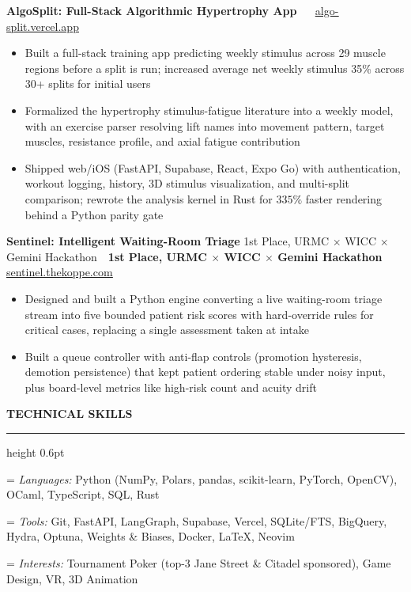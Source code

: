 \documentclass[10pt,letterpaper]{article}
\providecommand{\uline}[1]{\underline{#1}}
\newlength{\sectiongap}   \setlength{\sectiongap}{5.0pt}  %
\newlength{\sectiondrop}  \setlength{\sectiondrop}{2.5pt} %
\newlength{\entrygap}     \setlength{\entrygap}{3.0pt}    %
\newlength{\labelwd}      %
\newcommand{\link}[2]{\href{#1}{\uline{\textcolor{linkblue}{#2}}}}
\newcommand{\resumesection}[1]{%
  \vspace{\sectiongap}%
  {\bfseries\MakeUppercase{#1}}\par
  \vspace{1.5pt}%
  {\color{rulegray}\hrule height 0.6pt}%
  \vspace{\sectiondrop}%
}
\newcommand{\project}[4][]{%
  \vspace{\entrygap}%
  \textbf{#2}%
  \ifx\relax#1\relax\else\ \textcolor{rulegray}{\textbar}\ \textbf{#1}\fi
  \hfill \link{#3}{#4}\par
  \vspace{1.0pt}%
}
\newcommand{\detail}[2]{%
  \settowidth{\labelwd}{\textit{#1:} }%
  \hangindent=\labelwd\hangafter=1
  \textit{#1:} #2\par
}
\begin{document}
\project{AlgoSplit: Full-Stack Algorithmic Hypertrophy App}%
        {https://algo-split.vercel.app/}{algo-split.vercel.app}
\begin{itemize}
  \item Built a full-stack training app predicting weekly stimulus across 29 muscle regions before a split is run; increased average net weekly stimulus 35\% across 30+ splits for initial users
  \item Formalized the hypertrophy stimulus-fatigue literature into a weekly model, with an exercise parser resolving lift names into movement pattern, target muscles, resistance profile, and axial fatigue contribution
  \item Shipped web/iOS (FastAPI, Supabase, React, Expo Go) with authentication, workout logging, history, 3D stimulus visualization, and multi-split comparison; rewrote the analysis kernel in Rust for $335\%$ faster rendering behind a Python parity gate
\end{itemize}

\project[1st Place, URMC $\times$ WICC $\times$ Gemini Hackathon]%
        {Sentinel: Intelligent Waiting-Room Triage}%
        {https://sentinel.thekoppe.com/}{sentinel.thekoppe.com}
\begin{itemize}
  \item Designed and built a Python engine converting a live waiting-room triage stream into five bounded patient risk scores with hard-override rules for critical cases, replacing a single assessment taken at intake
  \item Built a queue controller with anti-flap controls (promotion hysteresis, demotion persistence) that kept patient ordering stable under noisy input, plus board-level metrics like high-risk count and acuity drift
\end{itemize}

\resumesection{Technical Skills}

\detail{Languages}{Python (NumPy, Polars, pandas, scikit-learn, PyTorch, OpenCV), OCaml, TypeScript, SQL, Rust}
\detail{Tools}{Git, FastAPI, LangGraph, Supabase, Vercel, SQLite/FTS, BigQuery, Hydra, Optuna, Weights \& Biases, Docker, \LaTeX, Neovim}
\detail{Interests}{Tournament Poker (top-3 Jane Street \& Citadel sponsored), Game Design, VR, 3D Animation}
\end{document}
